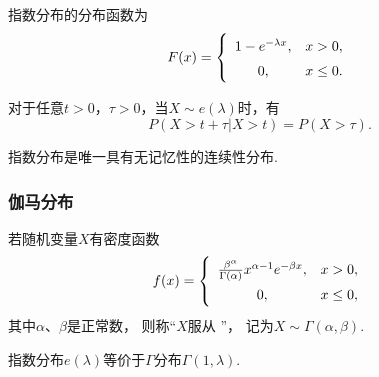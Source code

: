 \begin{theorem}
指数分布的分布函数为\begin{equation}
	F(x) = \left\{ \def\arraystretch{1.5}
	\begin{array}{cl}
		1 - e^{-\lambda x}, & x > 0, \\
		0, & x \leq 0. \\
	\end{array} \right.
\end{equation}
\end{theorem}

\begin{theorem}[指数分布的无记忆性]
对于任意\(t > 0\)，\(\tau > 0\)，当\(X \sim e(\lambda)\)时，有\[
P(X > t + \tau \vert X > t) = P(X > \tau).
\]

指数分布是唯一具有无记忆性的连续性分布.
\end{theorem}

\subsubsection{伽马分布}
\begin{definition}
若随机变量\(X\)有密度函数\begin{equation}
	f(x) = \left\{ \def\arraystretch{1.5} \begin{array}{cl}
		\frac{\beta^\alpha}{\Gamma(\alpha)} x^{\alpha-1} e^{-\beta x},
			& x > 0, \\
		0, & x \leq 0, \\
	\end{array} \right.
\end{equation}
其中\(\alpha\)、\(\beta\)是正常数，
则称“\(X\)服从 ”，
记为\(X \sim \Gamma(\alpha,\beta)\).
\end{definition}

指数分布\(e(\lambda)\)等价于\(\Gamma\)分布\(\Gamma(1,\lambda)\).

